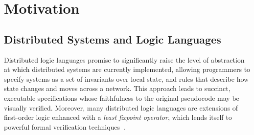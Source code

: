 \section{Motivation}

\subsection{Distributed Systems and Logic Languages}
\label{sec:dsll}


Distributed logic languages  promise to significantly raise the level of
abstraction at which distributed systems are currently implemented, allowing
programmers to specify systems as a set of invariants over local state,
and rules that describe how state changes and moves across a network. 
This approach leads to succinct, executable specifications whose faithfulness to the original pseudocode may be visually verified.
Moreover, many 
distributed logic languages are extensions of first-order logic enhanced with
a {\em least fixpoint operator}, which lends itself to powerful
formal verification techniques~\cite{wang, wang2}.

